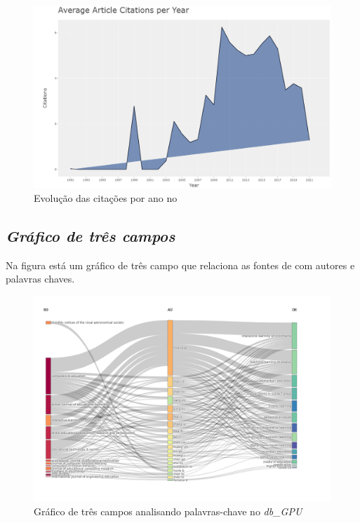 \begin{figure}[ht]
    \centering
    \includegraphics[width=12cm]{experiments/MarcusABR/PesquisaBibliometrica/Imagens/newplot(1).png}
    \caption{Evolução das citações por ano no \textit{}}
    \label{fig:gpu-citation-year}
\end{figure}

\subsection{\textit{Gráfico de três campos}}

Na figura está um gráfico de três campo que relaciona as fontes de com autores e palavras chaves.

\begin{figure}[ht]
    \centering
    \includegraphics[width=12cm]{experiments/MarcusABR/PesquisaBibliometrica/Imagens/newplot(3).png}
    \caption{Gráfico de três campos analisando palavras-chave no \textit{db\_GPU}}
    \label{fig:gpu-three-field}
\end{figure}

